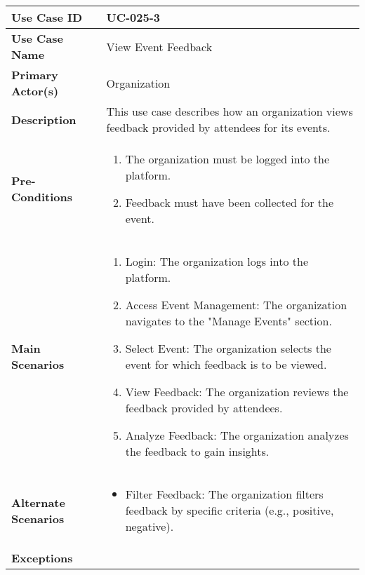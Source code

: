 \begin{table}[!ht]
    \centering
    \renewcommand{\arraystretch}{1.3} %
    \begin{tabularx}{\textwidth}{|l|X|}
        \hline
        \textbf{Use Case ID} & UC-025-3 \\
        \hline
        \textbf{Use Case Name} & View Event Feedback \\
        \hline
        \textbf{Primary Actor(s)} & Organization \\
        \hline
        \textbf{Description} & This use case describes how an organization views feedback provided by attendees for its events. \\
        \hline
        \textbf{Pre-Conditions} & 
        \begin{enumerate}[label=\arabic*.,itemsep=0pt]
            \item The organization must be logged into the platform.
            \item Feedback must have been collected for the event.
        \end{enumerate} \\
        \hline
        \textbf{Main Scenarios} & 
        \begin{enumerate}[label=\arabic*.,itemsep=0pt]
            \item Login: The organization logs into the platform.
            \item Access Event Management: The organization navigates to the "Manage Events" section.
            \item Select Event: The organization selects the event for which feedback is to be viewed.
            \item View Feedback: The organization reviews the feedback provided by attendees.
            \item Analyze Feedback: The organization analyzes the feedback to gain insights.
        \end{enumerate} \\
        \hline
        \textbf{Alternate Scenarios} & 
        \begin{itemize}[label=--,itemsep=0pt]
            \item Filter Feedback: The organization filters feedback by specific criteria (e.g., positive, negative).
        \end{itemize} \\
        \hline
        \textbf{Exceptions} & 
        \begin{itemize}[label=--,itemsep=0pt]

\end{itemize}
\end{tabularx}
\end{table}
